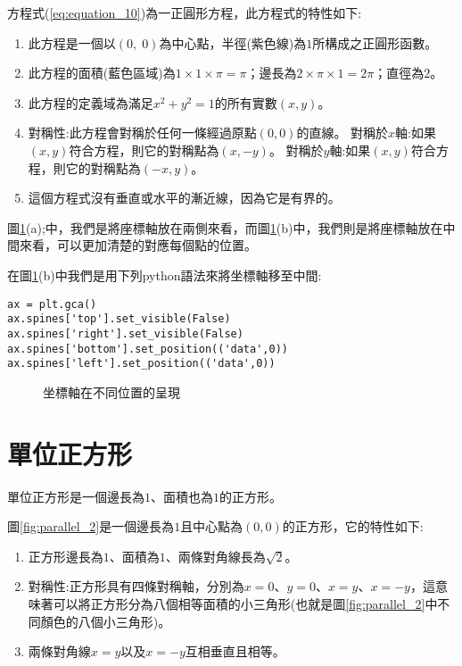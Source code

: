 \documentclass[12pt, a4paper]{article}
\begin{document}
方程式\;(\ref{eq:equation_10})\;為一正圓形方程，此方程式的特性如下\;:
\begin{enumerate}
\item 此方程是一個以\;$(0,\;0)$\;為中心點，半徑(紫色線)為\;$1$\;所構成之正圓形函數。
\item 此方程的面積(藍色區域)為\;$1 \times 1 \times \pi =\pi$\;；邊長為\;$2 \times \pi \times 1=2\pi$\;；直徑為\;$2$\;。
\item 此方程的定義域為滿足\;$x^2+y^2=1$\;的所有實數\;$(x,y)$\;。
\item 對稱性\;:\;此方程會對稱於任何一條經過原點\;$(0,0)$\;的直線。
\subitem 對稱於\;$x$\;軸:如果\;$(x, y)$\;符合方程，則它的對稱點為\;$(x,-y)$\;。
\subitem 對稱於\;$y$\;軸:如果\;$(x, y)$\;符合方程，則它的對稱點為\;$(-x,y)$\;。
\item 這個方程式沒有垂直或水平的漸近線，因為它是有界的。
\end{enumerate}

圖\;\ref{fig:parallel2_2}\;(a);中，我們是將座標軸放在兩側來看，而圖\;\ref{fig:parallel2_2}\;(b)\;中，我們則是將座標軸放在中間來看，可以更加清楚的對應每個點的位置。

在圖\;\ref{fig:parallel2_2}\;(b)\;中我們是用下列python語法來將坐標軸移至中間\;:
\begin{lstlisting}
ax = plt.gca()
ax.spines['top'].set_visible(False) 
ax.spines['right'].set_visible(False)
ax.spines['bottom'].set_position(('data',0))
ax.spines['left'].set_position(('data',0))
\end{lstlisting}

\begin{figure}[H]
\centering
{}
\caption{坐標軸在不同位置的呈現}
\label{fig:parallel2_2}
\end{figure}

\section{單位正方形}
單位正方形是一個邊長為\;$1$\;、面積也為\;$1$\;的正方形。

圖\;\ref{fig:parallel_2}\;是一個邊長為\;$1$\;且中心點為\;$(0,0)$\;的正方形，它的特性如下\;:
\begin{enumerate}
\item 正方形邊長為\;$1$\;、面積為\;$1$\;、兩條對角線長為\;$\sqrt{2}$\;。
\item 對稱性\;:\;正方形具有四條對稱軸，分別為\;$x=0$、$y=0$、$x=y$、$x=-y$\;，這意味著可以將正方形分為八個相等面積的小三角形(也就是圖\;\ref{fig:parallel_2}\;中不同顏色的八個小三角形)。
\item  兩條對角線\;$x=y$\;以及\;$x=-y$\;互相垂直且相等。
\end{enumerate}
\end{document}
